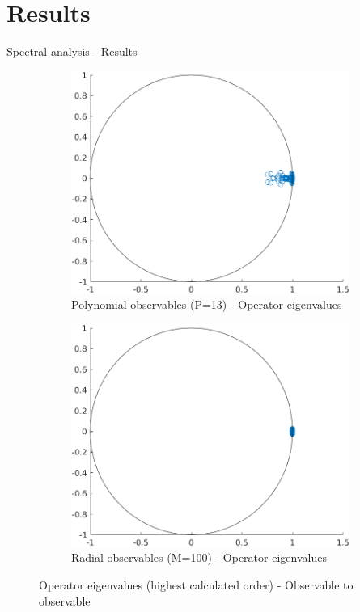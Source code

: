 \documentclass{beamer}
\begin{document}
\section{Results}

\begin{frame}{Spectral analysis - Results}
    \begin{figure}
        \centering
        \begin{subfigure}[b]{0.45\textwidth}
            \centering
            \includegraphics[width=\textwidth]{Eigen_Poly.png}
            \caption{Polynomial observables (P=13) - Operator eigenvalues}
            \label{fig:eigen_poly}
        \end{subfigure}
        \hfill
        \begin{subfigure}[b]{0.45\textwidth}
            \centering
            \includegraphics[width=\textwidth]{Eigen_Radial.png}
            \caption{Radial observables (M=100) - Operator eigenvalues}
            \label{fig:eigen_radial}
        \end{subfigure}
        \caption{Operator eigenvalues (highest calculated order) - Observable to observable}
    \end{figure}
\end{frame}
\end{document}
